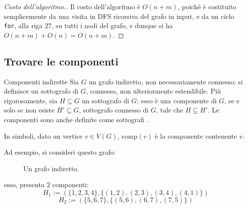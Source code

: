 \documentclass[a4paper, 12pt]{report}
\begin{document}
    \begin{proof}[Costo dell'algoritmo.]
        Il costo dell'algoritmo è $O(n + m)$, poiché è costituito semplicemente da una visita in DFS ricorsiva del grafo in input, e da un ciclo \texttt{for}, alla riga $27$, su tutti i nodi del grafo, e dunque si ha $O(n + m) + O(n) = O(n + m)$.
    \end{proof}

    \subsection{Trovare le componenti}

    \begin{frameddefn}{Componenti indirette}
        Sia $G$ un grafo indiretto, non necessariamente connesso; si definisce  un sottografo di $G$, connesso, non ulteriormente estendibile. Più rigorosamente, sia $H \subseteq G$ un sottografo di $G$; esso è una componente di $G$, se e solo se non esiste $H' \subseteq G$, sottografo connesso di $G$, tale che $H \subsetneq H'$. Le componenti sono anche definite come sottografi .

        In simboli, dato un vertice $v \in V(G)$, $\mathrm{comp}(v)$ è la componente contenente $v$.
    \end{frameddefn}

    \begin{example}
        Ad esempio, si consideri questo grafo:

        \begin{figure}[H]
            \centering
            \caption{Un grafo indiretto.}
        \end{figure}

        esso, presenta $2$ componenti: $$H_1 := (\{1, 2, 3, 4\}, \{(1, 2), (2, 3), (3, 4), (4, 1)\})$$ $$H_2 := (\{5, 6, 7\}, \{(5, 6), (6, 7), (7, 5)\})$$
    \end{example}
\end{document}
